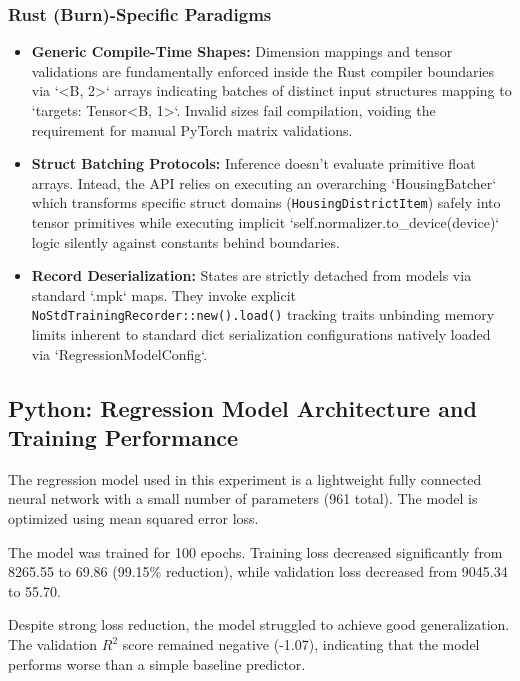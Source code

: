 \documentclass{ieeeaccess}
\begin{document}
\subsubsection{Rust (Burn)-Specific Paradigms}
\begin{itemize}
    \item \textbf{Generic Compile-Time Shapes:} Dimension mappings and tensor validations are fundamentally enforced inside the Rust compiler boundaries via `<B, 2>` arrays indicating batches of distinct input structures mapping to `targets: Tensor<B, 1>`. Invalid sizes fail compilation, voiding the requirement for manual PyTorch matrix validations.
    \item \textbf{Struct Batching Protocols:} Inference doesn't evaluate primitive float arrays. Intead, the API relies on executing an overarching `HousingBatcher` which transforms specific struct domains (\texttt{HousingDistrictItem}) safely into tensor primitives while executing implicit `self.normalizer.to\_device(device)` logic silently against constants behind boundaries.
    \item \textbf{Record Deserialization:} States are strictly detached from models via standard `.mpk` maps. They invoke explicit \texttt{NoStdTrainingRecorder::new().load()} tracking traits unbinding memory limits inherent to standard dict serialization configurations natively loaded via `RegressionModelConfig`.
\end{itemize}

\newpage
\subsection{Python: Regression Model Architecture and Training Performance}

The regression model used in this experiment is a lightweight fully connected neural network with a small number of parameters (961 total). The model is optimized using mean squared error loss.



The model was trained for 100 epochs. Training loss decreased significantly from 8265.55 to 69.86 (99.15\% reduction), while validation loss decreased from 9045.34 to 55.70.

Despite strong loss reduction, the model struggled to achieve good generalization. The validation $R^2$ score remained negative (-1.07), indicating that the model performs worse than a simple baseline predictor.
\end{document}

